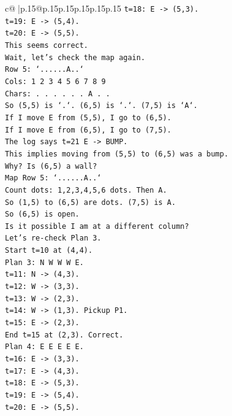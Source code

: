 \documentclass{article}
\begin{document}
{\begin{supertabular}{c@{$\;$}|p{.15\linewidth}@{}p{.15\linewidth}p{.15\linewidth}p{.15\linewidth}p{.15\linewidth}p{.15\linewidth}}
{{{\texttt{t=18: E {-}> (5,3).} \\
\texttt{t=19: E {-}> (5,4).} \\
\texttt{t=20: E {-}> (5,5).} \\
\texttt{This seems correct.} \\
\texttt{Wait, let's check the map again.} \\
\texttt{Row 5: `......A..`} \\
\texttt{Cols: 1 2 3 4 5 6 7 8 9} \\
\texttt{Chars: . . . . . . A . .} \\
\texttt{So (5,5) is `.`. (6,5) is `.`. (7,5) is `A`.} \\
\texttt{If I move E from (5,5), I go to (6,5).} \\
\texttt{If I move E from (6,5), I go to (7,5).} \\
\texttt{The log says t=21 E {-}> BUMP.} \\
\texttt{This implies moving from (5,5) to (6,5) was a bump.} \\
\texttt{Why? Is (6,5) a wall?} \\
\texttt{Map Row 5: `......A..`} \\
\texttt{Count dots: 1,2,3,4,5,6 dots. Then A.} \\
\texttt{So (1,5) to (6,5) are dots. (7,5) is A.} \\
\texttt{So (6,5) is open.} \\
\texttt{Is it possible I am at a different column?} \\
\texttt{Let's re{-}check Plan 3.} \\
\texttt{Start t=10 at (4,4).} \\
\texttt{Plan 3: N W W W E.} \\
\texttt{t=11: N {-}> (4,3).} \\
\texttt{t=12: W {-}> (3,3).} \\
\texttt{t=13: W {-}> (2,3).} \\
\texttt{t=14: W {-}> (1,3). Pickup P1.} \\
\texttt{t=15: E {-}> (2,3).} \\
\texttt{End t=15 at (2,3). Correct.} \\
\texttt{Plan 4: E E E E E.} \\
\texttt{t=16: E {-}> (3,3).} \\
\texttt{t=17: E {-}> (4,3).} \\
\texttt{t=18: E {-}> (5,3).} \\
\texttt{t=19: E {-}> (5,4).} \\
\texttt{t=20: E {-}> (5,5).} \\
}}}
\end{supertabular}}
\end{document}
